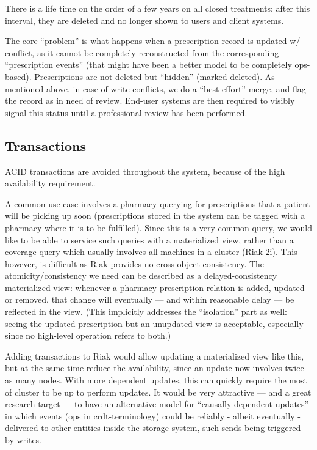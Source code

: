 \documentclass[11pt,a4paper]{report}
\begin{document}
There is a life time on the order of a few years on all closed treatments; after this interval, they are deleted and no longer shown to users and client systems.

The core ``problem'' is what happens when a prescription record is updated w/ conflict, as it cannot be completely reconstructed from the corresponding ``prescription events'' (that might have been a better model to be completely ops-based). Prescriptions are not deleted but ``hidden'' (marked deleted). As mentioned above, in case of write conflicts, we do a ``best effort'' merge, and flag the record as in need of review. End-user systems are then required to visibly signal this status until a professional review has been performed.


\subsection{Transactions}
ACID transactions are avoided throughout the system, because of the high availability requirement.

A common use case involves a pharmacy querying for prescriptions that a patient will be picking up soon (prescriptions stored in the system can be tagged with a pharmacy where it is to be fulfilled). Since this is a very common query, we would like to be able to service such queries with a materialized view, rather than a coverage query which usually involves all machines in a cluster (Riak 2i). This however, is difficult as Riak provides no cross-object consistency.
The atomicity/consistency we need can be described as a delayed-consistency materialized view: whenever a pharmacy-prescription relation is added, updated or removed, that change will eventually — and within reasonable delay — be reflected in the view.
(This implicitly addresses the ``isolation'' part as well: seeing the updated prescription but an unupdated view is acceptable, especially since no high-level operation refers to both.)

Adding transactions to Riak would allow updating a materialized view like this, but at the same time reduce the availability, since an update now involves twice as many nodes. With more dependent updates, this can quickly require the most of cluster to be up to perform updates.
It would be very attractive — and a great research target — to have an alternative model for ``causally dependent updates'' in which events (ops in \gls{crdt}-terminology) could be reliably - albeit eventually - delivered to other entities inside the storage system, such sends being triggered by writes.
\end{document}

